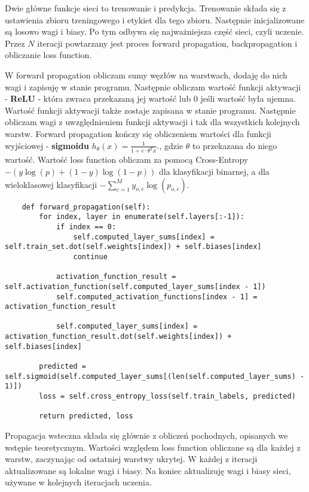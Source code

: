 \documentclass[12pt]{article}
\begin{document}
Dwie główne funkcje sieci to trenowanie i predykcja. Trenowanie składa się z ustawienia zbioru treningowego i etykiet dla tego zbioru. Następnie inicjalizowane są losowo wagi i biasy. Po tym odbywa się najważniejsza część sieci, czyli uczenie. Przez $N$ iteracji powtarzany jest proces forward propagation, backpropagation i obliczanie loss function.

W forward propagation obliczam sumy węzłów na warstwach, dodaję do nich wagi i zapisuję w stanie programu. Następnie obliczam wartość funkcji aktywacji - \textbf{ReLU} - która zwraca przekazaną jej wartość lub $0$ jeśli wartość była ujemna. Wartość funkcji aktywacji także zostaje zapisana w stanie programu. Następnie obliczam wagi z uwzględnieniem funkcji aktywacji i tak dla wszystkich kolejnych warstw. Forward propagation kończy się obliczeniem wartości dla funkcji wyjściowej - \textbf{sigmoidu} $ h_ \theta (x) =  \frac{\mathrm{1} }{\mathrm{1} + e^- \theta^Tx }  $., gdzie $\theta$ to przekazana do niego wartość. Wartość loss function obliczam za pomocą Cross-Entropy $-{(y\log(p) + (1 - y)\log(1 - p))}$ dla klasyfikacji binarnej, a dla wieloklasowej klasyfikacji $
-\sum_{c=1}^My_{o,c}\log(p_{o,c})$.

\noindent
    \begin{verbatim}
    def forward_propagation(self):
        for index, layer in enumerate(self.layers[:-1]):
            if index == 0:
                self.computed_layer_sums[index] = self.train_set.dot(self.weights[index]) + self.biases[index]
                continue

            activation_function_result = self.activation_function(self.computed_layer_sums[index - 1])
            self.computed_activation_functions[index - 1] = activation_function_result

            self.computed_layer_sums[index] = activation_function_result.dot(self.weights[index]) + self.biases[index]

        predicted = self.sigmoid(self.computed_layer_sums[(len(self.computed_layer_sums) - 1)])
        loss = self.cross_entropy_loss(self.train_labels, predicted)

        return predicted, loss
    \end{verbatim}

\noindent

Propagacja wsteczna składa się głównie z obliczeń pochodnych, opisanych we wstępie teoretycznym. Wartości względem loss function obliczane są dla każdej z warstw, zaczynając od ostatniej warstwy ukrytej. W każdej z iteracji aktualizowane są lokalne wagi i biasy. Na koniec aktualizuję wagi i biasy sieci, używane w kolejnych iteracjach uczenia.
\end{document}
